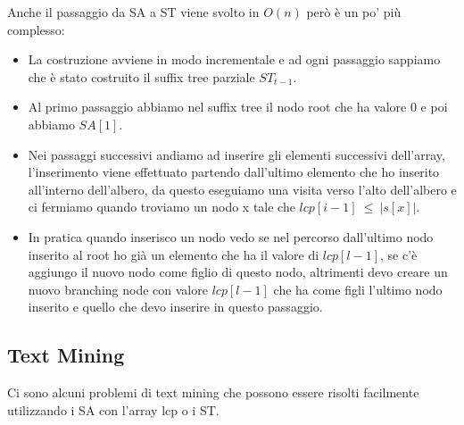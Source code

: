 \documentclass[14pt]{extreport}
\begin{document}
Anche il passaggio da SA a ST viene svolto in $O(n)$ però è un po' più complesso:
\begin{itemize}
\item La costruzione avviene in modo incrementale e ad ogni passaggio sappiamo che è stato costruito il suffix tree parziale $ST_{t-1}$.
\item Al primo passaggio abbiamo nel suffix tree il nodo root che ha valore 0 e poi abbiamo $SA[1]$.
\item Nei passaggi successivi andiamo ad inserire gli elementi successivi dell'array, l'inserimento viene effettuato partendo dall'ultimo elemento che ho inserito all'interno dell'albero, da questo eseguiamo una visita verso l'alto dell'albero e ci fermiamo quando troviamo un nodo x tale che $lcp[i-1]\ \leq \ |s[x]|$.
\item In pratica quando inserisco un nodo vedo se nel percorso dall'ultimo nodo inserito al root ho già un elemento che ha il valore di $lcp[l-1]$, se c'è aggiungo il nuovo nodo come figlio di questo nodo, altrimenti devo creare un nuovo branching node con valore $lcp[l-1]$ che ha come figli l'ultimo nodo inserito e quello che devo inserire in questo passaggio.
\end{itemize}

\subsection{Text Mining}

Ci sono alcuni problemi di text mining che possono essere risolti facilmente utilizzando i SA con l'array lcp o i ST.
\end{document}

